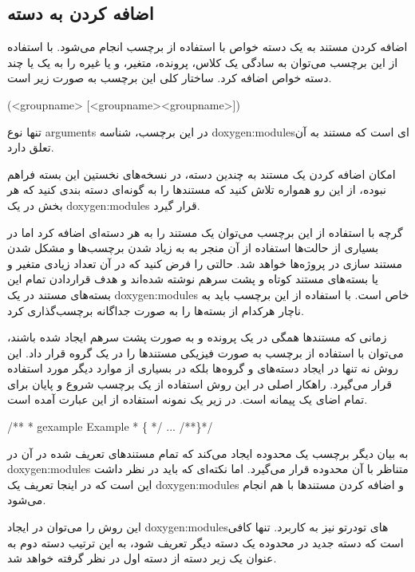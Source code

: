 \subsection{اضافه کردن به دسته}
اضافه کردن مستند به یک دسته خواص با استفاده از برچسب  انجام می‌شود. با
استفاده از این برچسب می‌توان به سادگی یک کلاس، پرونده، متغیر، و یا غیره را به یک یا چند
دسته خواص اضافه کرد. ساختار کلی این برچسب به صورت زیر است.

\begin{C++}
\ingroup (<groupname> [<groupname><groupname>])
\end{C++}
تنها نوع \glspl{argument} در این برچسب، شناسه \glspl{doxygen:module}‌ای است که مستند به آن 
تعلق دارد.

\begin{warning}
امکان اضافه کردن یک مستند به چندین دسته، در نسخه‌های نخستین این بسته فراهم نبوده، از
این رو همواره تلاش کنید که مستندها را به گونه‌ای دسته بندی کنید که هر بخش در یک \glspl{doxygen:module}
قرار گیرد.
\end{warning}

گرچه با استفاده از این برچسب می‌توان یک مستند را به هر دسته‌ای اضافه کرد اما در
بسیاری از حالت‌ها استفاده از آن منجر به به زیاد شدن برچسب‌ها و مشکل شدن مستند سازی
در پروژه‌ها خواهد شد. حالتی را فرض کنید که در آن تعداد زیادی متغیر و یا بسته‌های 
مستند کوتاه و پشت سرهم نوشته شده‌اند و هدف قراردادن تمام این بسته‌های مستند در یک
\glspl{doxygen:module} خاص است. با استفاده از این برچسب باید به ناچار هرکدام از بسته‌ها را به صورت
جداگانه برچسب‌گذاری کرد. 

زمانی که مستند‌ها همگی در یک پرونده و به صورت پشت سرهم ایجاد شده باشند، می‌توان با
استفاده از برچسب \lr{ \ \{  \ \}} به صورت فیزیکی مستند‌ها را در یک گروه قرار داد.
این روش نه تنها در ایجاد دسته‌های و گروه‌ها بلکه در بسیاری از موارد دیگر
مورد استفاده قرار می‌گیرد. راهکار اصلی در این روش استفاده از یک برچسب شروع و پایان
برای تمام اضای یک پیمانه است. در زیر یک نمونه استفاده از این عبارت آمده است.

\begin{C++}
/**
 *  gexample Example
 * \{
 */
 ...
/**\}*/
\end{C++}
به بیان دیگر برچسب  \lr{ \ \{  \ \}} یک محدوده ایجاد می‌کند که تمام مستندهای تعریف شده در آن
در \glspl{doxygen:module} متناظر با آن محدوده قرار می‌گیرد. اما نکته‌ای که باید در نظر داشت این است که
در اینجا تعریف یک \glspl{doxygen:module} و اضافه کردن مستندها با هم انجام می‌شود.

این روش را می‌توان در ایجاد \glspl{doxygen:module}‌های تودرتو نیز به کاربرد. تنها کافی است که دسته
جدید در محدوده یک دسته دیگر تعریف شود، به این ترتیب دسته دوم به عنوان یک زیر
دسته از دسته اول در نظر گرفته خواهد شد.

